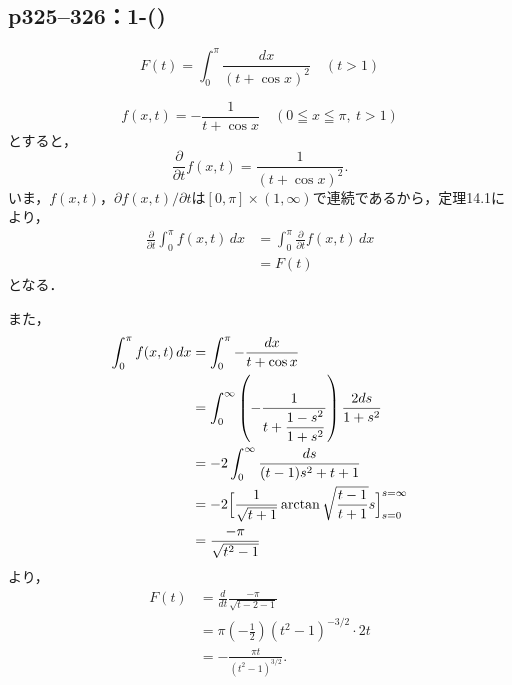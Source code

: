 \documentclass[a4paper,10pt,fleqn]{ltjsarticle}
\begin{document}
\newpage


\subsection*{p325--326：1-()}

\begin{tleftbar}
    \[
        F(t) = \int_0^\pi \frac{dx}{(t + \cos x)^2} \quad (t > 1)
    \]

    \[
        f(x,t) = - \frac{1}{t+\cos x} \quad ( 0 \leqq x \leqq \pi , ~ t>1)
    \]
    とすると，
    \[
        \frac{\partial}{\partial t}  f(x,t) = \frac{1}{(t+\cos x)^2}.
    \]
    いま，$f(x,t)$，$\partial f(x,t) / \partial t $は$[0,\pi] \times (1,\infty)$で連続であるから，定理14.1により，
    \begin{align*}
        \frac{\partial}{\partial t} \int_0^\pi f(x,t) \, dx & = \int_0^\pi \frac{\partial}{\partial t} f(x,t) \, dx \\
                                                            & = F(t)
    \end{align*}
    となる．

    また，
    \begin{align*}
        \int_0^\pi f(x,t) \, dx & = \int_0^\pi - \frac{dx}{t+\cos x}                                                        \\
                                & = \int_0^\infty \left ( - \frac{1}{t+\dfrac{1-s^2}{1+s^2}} \right) \frac{2ds}{1+s^2}      \\
                                & = -2\int_0^\infty \frac{ds}{(t-1)s^2+t+1}                                                 \\
                                & = -2 \Bigl [ \frac{1}{\sqrt{t+1}} \arctan \sqrt{\frac{t-1}{t+1}}s \Bigr]_{s=0}^{s=\infty} \\
                                & = \frac{-\pi}{\sqrt{t^2-1}}
    \end{align*}
    より，
    \begin{align*}
        F(t) & = \frac{d}{dt} \frac{-\pi}{\sqrt{t-2-1}}                 \\
             & = \pi \left(-\frac{1}{2} \right) (t^2-1)^{-3/2} \cdot 2t \\
             & = -\frac{\pi t}{(t^2-1)^{3/2}}.
    \end{align*}
\end{tleftbar}
\end{document}
